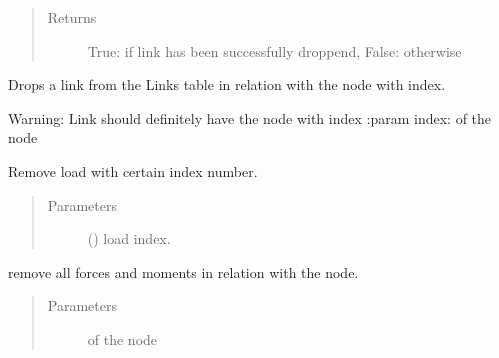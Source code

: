 \documentclass[letterpaper,10pt,english]{sphinxmanual}
\begin{document}
\begin{fulllineitems}
\begin{fulllineitems}
\begin{quote}
\begin{description}
\item[{Returns}] \leavevmode
True: if link has been successfully droppend, False: otherwise

\end{description}\end{quote}

\end{fulllineitems}


\begin{fulllineitems}
\label{\detokenize{api:beamon.database.Database.remove_link_with_node}}
Drops a link from the Links table in relation with the node with index.

Warning: Link should definitely have the node with index
:param index: of the node

\end{fulllineitems}


\begin{fulllineitems}
\label{\detokenize{api:beamon.database.Database.remove_load}}
Remove load with certain index number.
\begin{quote}\begin{description}
\item[{Parameters}] \leavevmode
{} () \textendash{} load index.

\end{description}\end{quote}

\end{fulllineitems}


\begin{fulllineitems}
\label{\detokenize{api:beamon.database.Database.remove_loads_with_node}}
remove all forces and moments in relation with the node.
\begin{quote}\begin{description}
\item[{Parameters}] \leavevmode
{} \textendash{} of the node


\end{description}
\end{quote}
\end{fulllineitems}
\end{fulllineitems}
\end{document}
